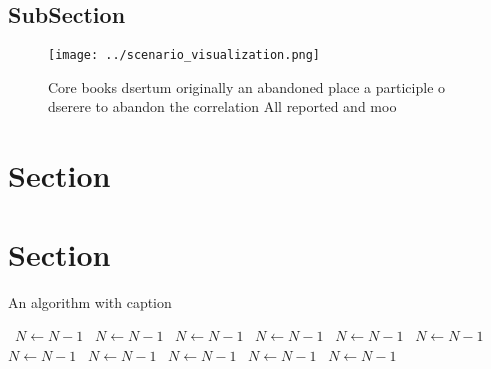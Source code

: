 \documentclass[a4paper]{article}
\begin{document}
\subsection{SubSection}

\begin{figure}
\centering
\texttt{[image: ../scenario\_visualization.png]}
\caption{Core books dsertum originally an abandoned place a participle o dserere to abandon the correlation All reported and moo
}
\end{figure}
 
\section{Section}

\section{Section}

\begin{algorithm}
\caption{An algorithm with caption}
\begin{algorithmic}
\    \State $N \gets N - 1$
\    \State $N \gets N - 1$
\    \State $N \gets N - 1$
\    \State $N \gets N - 1$
\    \State $N \gets N - 1$
\    \State $N \gets N - 1$
\    \State $N \gets N - 1$
\    \State $N \gets N - 1$
\    \State $N \gets N - 1$
\    \State $N \gets N - 1$
\    \State $N \gets N - 1$
\EndWhile
\end{algorithmic}
\end{algorithm}
\end{document}
